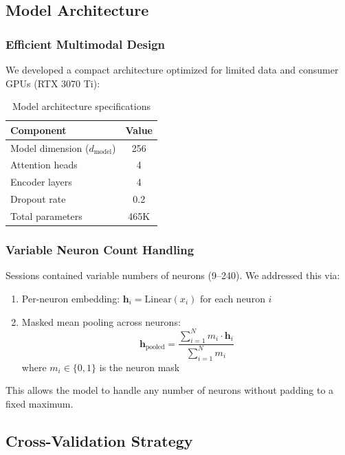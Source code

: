 \documentclass[11pt,twocolumn]{article}
\begin{document}
\subsection{Model Architecture}

\subsubsection{Efficient Multimodal Design}
We developed a compact architecture optimized for limited data and consumer GPUs (RTX 3070 Ti):

\begin{table}[htbp]
\centering
\caption{Model architecture specifications}
\label{tab:architecture}
\begin{tabular}{lc}
\toprule
\textbf{Component} & \textbf{Value} \\
\midrule
Model dimension ($d_{\text{model}}$) & 256 \\
Attention heads & 4 \\
Encoder layers & 4 \\
Dropout rate & 0.2 \\
Total parameters & 465K \\
\bottomrule
\end{tabular}
\end{table}

\subsubsection{Variable Neuron Count Handling}
Sessions contained variable numbers of neurons (9--240). We addressed this via:
\begin{enumerate}
    \item Per-neuron embedding: $\mathbf{h}_i = \text{Linear}(x_i)$ for each neuron $i$
    \item Masked mean pooling across neurons:
    \begin{equation}
    \mathbf{h}_{\text{pooled}} = \frac{\sum_{i=1}^{N} m_i \cdot \mathbf{h}_i}{\sum_{i=1}^{N} m_i}
    \end{equation}
    where $m_i \in \{0,1\}$ is the neuron mask
\end{enumerate}

This allows the model to handle any number of neurons without padding to a fixed maximum.

\subsection{Cross-Validation Strategy}
\end{document}
